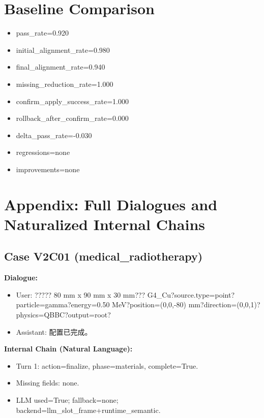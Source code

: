 \documentclass[11pt]{ctexart}
\begin{document}
\section{Baseline Comparison}
\begin{itemize}
\item pass\_rate=0.920
\item initial\_alignment\_rate=0.980
\item final\_alignment\_rate=0.940
\item missing\_reduction\_rate=1.000
\item confirm\_apply\_success\_rate=1.000
\item rollback\_after\_confirm\_rate=0.000
\item delta\_pass\_rate=-0.030
\item regressions=none
\item improvements=none
\end{itemize}
\appendix
\section{Appendix: Full Dialogues and Naturalized Internal Chains}
\subsection{Case V2C01 (medical\_radiotherapy)}
\textbf{Dialogue:}
\begin{itemize}
\item User: ????? 80 mm x 90 mm x 30 mm??? G4\_Cu?source.type=point?particle=gamma?energy=0.50 MeV?position=(0,0,-80) mm?direction=(0,0,1)?physics=QBBC?output=root?
\item Assistant: 配置已完成。
\end{itemize}
\textbf{Internal Chain (Natural Language):}
\begin{itemize}
\item Turn 1: action=finalize, phase=materials, complete=True.
\item Missing fields: none.
\item LLM used=True; fallback=none; backend=llm\_slot\_frame+runtime\_semantic.
\end{itemize}
\end{document}
